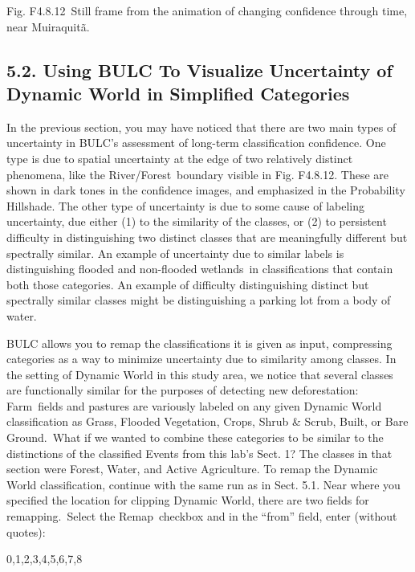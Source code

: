 \documentclass[
  letterpaper,
  DIV=11,
  numbers=noendperiod]{scrreprt}
\begin{document}
Fig. F4.8.12~Still frame from the animation of changing confidence
through time, near Muiraquitã.

\hypertarget{using-bulc-to-visualize-uncertainty-of-dynamic-world-in-simplified-categories}{%
\subsection{5.2. Using BULC To Visualize Uncertainty of Dynamic World in
Simplified
Categories}\label{using-bulc-to-visualize-uncertainty-of-dynamic-world-in-simplified-categories}}

In the previous section, you may have noticed that there are two main
types of uncertainty in BULC's assessment of long-term classification
confidence. One type is due to spatial uncertainty at the edge of two
relatively distinct phenomena, like the River/Forest~boundary visible in
Fig. F4.8.12. These are shown in dark tones in the confidence images,
and emphasized in the Probability Hillshade. The other type of
uncertainty is due to some cause of labeling uncertainty, due either (1)
to the similarity of the classes, or (2) to persistent difficulty in
distinguishing two distinct classes that are meaningfully different but
spectrally similar. An example of uncertainty due to similar labels is
distinguishing flooded and non-flooded wetlands~in classifications that
contain both those categories. An example of difficulty distinguishing
distinct but spectrally similar classes might be distinguishing a
parking lot from a body of water.

BULC allows you to remap the classifications it is given as input,
compressing categories as a way to minimize uncertainty due to
similarity among classes. In the setting of Dynamic World in this study
area, we notice that several classes are functionally similar for the
purposes of detecting new deforestation: Farm~fields and pastures are
variously labeled on any given Dynamic World classification as Grass,
Flooded Vegetation, Crops, Shrub \& Scrub, Built, or Bare Ground.~What
if we wanted to combine these categories to be similar to the
distinctions of the classified Events from this lab's Sect. 1? The
classes in that section were Forest, Water, and Active Agriculture. To
remap the Dynamic World classification, continue with the same run as in
Sect. 5.1. Near where you specified the location for clipping Dynamic
World, there are two fields for remapping.~Select the Remap~checkbox and
in the ``from'' field, enter (without quotes):

0,1,2,3,4,5,6,7,8
\end{document}
